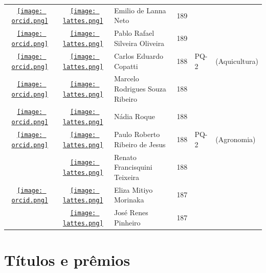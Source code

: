 \documentclass[12pt,brazil]{article}\usepackage[]{graphicx}\usepackage[]{xcolor}
\begin{document}
\begin{longtable}{cclrll}
\href{https://orcid.org/0000-0002-6170-1842}{\texttt{[image: orcid.png]}} & \href{http://lattes.cnpq.br/6341280285112278}{\texttt{[image: lattes.png]}} & Emilio de Lanna Neto & 189 &  &  \\

\href{https://orcid.org/0000-0001-9541-3737}{\texttt{[image: orcid.png]}} & \href{http://lattes.cnpq.br/0858029972032771}{\texttt{[image: lattes.png]}} & Pablo Rafael Silveira Oliveira & 189 &  &  \\

\href{https://orcid.org/0000-0002-0114-0334}{\texttt{[image: orcid.png]}} & \href{http://lattes.cnpq.br/2254441871778798}{\texttt{[image: lattes.png]}} & Carlos Eduardo Copatti & 188 & PQ-2 & (Aquicultura) \\

\href{https://orcid.org/0000-0003-3675-6101}{\texttt{[image: orcid.png]}} & \href{http://lattes.cnpq.br/1614542610299046}{\texttt{[image: lattes.png]}} & Marcelo Rodrigues Souza Ribeiro & 188 &  &  \\

\href{https://orcid.org/0000-0002-2103-917X}{\texttt{[image: orcid.png]}} & \href{http://lattes.cnpq.br/5440627437026794}{\texttt{[image: lattes.png]}} & Nádia Roque & 188 &  &  \\

\href{https://orcid.org/0000-0001-9622-5076}{\texttt{[image: orcid.png]}} & \href{http://lattes.cnpq.br/2372350954162223}{\texttt{[image: lattes.png]}} & Paulo Roberto Ribeiro de Jesus & 188 & PQ-2 & (Agronomia) \\

 & \href{http://lattes.cnpq.br/5431372913641696}{\texttt{[image: lattes.png]}} & Renato Francisquini Teixeira & 188 &  &  \\

\href{https://orcid.org/0000-0003-2637-8127}{\texttt{[image: orcid.png]}} & \href{http://lattes.cnpq.br/6863118601469508}{\texttt{[image: lattes.png]}} & Eliza Mitiyo Morinaka & 187 &  &  \\

 & \href{http://lattes.cnpq.br/2333794966860226}{\texttt{[image: lattes.png]}} & José Renes Pinheiro & 187 &  &  \\


\bottomrule
\end{longtable}

\clearpage

\section{Títulos e prêmios}
\end{document}
